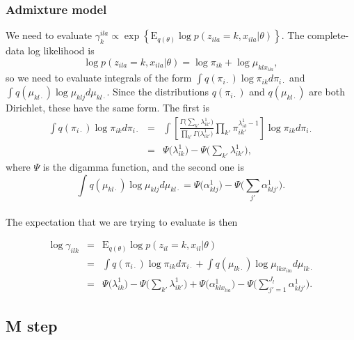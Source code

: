 \documentclass[12pt,a4paper,reqno]{article}
\newcommand{\E}{\text{E}{}}
\newcommand{\(}{\left(}
\newcommand{\)}{\right)}
\newcommand{\|}{\arrowvert}
\renewcommand{\digamma}{\Psi}
\begin{document}
\subsubsection{Admixture model}
\label{E-step-appendix-admixture}
We need to evaluate $\gamma^{ila}_{k} \propto \exp\left\{\E_{q(\theta)} \log p(z_{ila}=k,x_{ila}|\theta)\right\}$. The complete-data log likelihood is
\begin{equation*}
\log p(z_{ila}=k,x_{ila}|\theta) = \log \pi_{ik} + \log \mu_{klx_{ila}},
\end{equation*}
so we need to evaluate integrals of the form $\int q(\pi_{i\cdot}) \log \pi_{ik} d\pi_{i\cdot}$ and $\int q(\mu_{kl\cdot}) \log \mu_{klj} d\mu_{kl\cdot}$. Since the distributions $q(\pi_{i\cdot})$ and $q(\mu_{kl\cdot})$ are both Dirichlet, these have the same form. The first is
\begin{eqnarray*}
\int q(\pi_{i\cdot}) \log \pi_{ik} d\pi_{i\cdot} 
&=& \int \left[\frac{\Gamma\Big(\sum_{k'}\lambda^{1}_{ik'}\Big)}{\prod_{k'}\Gamma\Big(\lambda^{1}_{ik'}\Big)}\prod_{k'}\pi_{ik'}^{\lambda^{1}_{ik}-1}\right] \log \pi_{ik} d\pi_{i\cdot} \\
&=& \digamma\Big(\lambda^{1}_{ik}\Big) - \digamma\Big(\sum_{k'}\lambda^{1}_{ik'}\Big),
\end{eqnarray*}
where $\digamma$ is the digamma function, and the second one is
\begin{equation*}
\int q(\mu_{kl\cdot}) \log \mu_{klj} d\mu_{kl\cdot} = \digamma\Big(\alpha^{1}_{klj}\Big) - \digamma\Big(\sum_{j'}\alpha^{1}_{klj'}\Big).
\end{equation*}

\paragraph{}
The expectation that we are trying to evaluate is then

\begin{eqnarray*}
\log \gamma_{ilk} 
&=& \E_{q(\theta)}\log p(z_{il}=k,x_{il}|\theta) \\
&=& \int q(\pi_{i\cdot}) \log \pi_{ik} d\pi_{i\cdot} + \int q(\mu_{lk\cdot}) \log \mu_{lkx_{ila}} d\mu_{lk\cdot} \\
&=& \digamma\Big(\lambda^{1}_{ik}\Big) - \digamma\Big(\sum_{k'}\lambda^{1}_{ik'}\Big) + \digamma\Big(\alpha^{1}_{klx_{lia}}\Big) - \digamma\Big(\sum_{j'=1}^{J_{l}}\alpha^{1}_{klj'}\Big).
\end{eqnarray*}

\subsection{M step}
\end{document}

